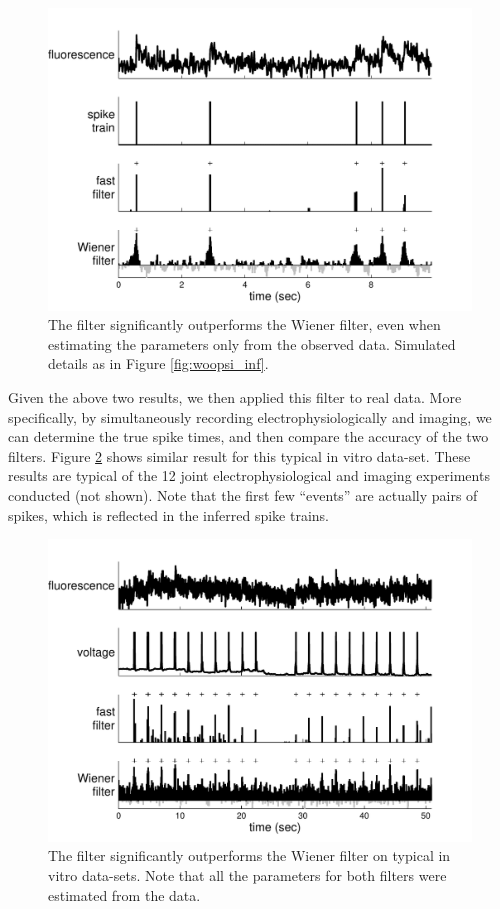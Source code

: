 \begin{figure}[h!]
\centering \includegraphics[width=.9\linewidth]{../figs/woopsi_learn}
\caption{The \foopsi filter significantly outperforms the Wiener filter, even when estimating the parameters only from the observed data.  Simulated details as in Figure \ref{fig:woopsi_inf}.} \label{fig:woopsi_learn}
\end{figure}

Given the above two results, we then applied this \foopsi filter to real data.  More specifically, by simultaneously recording electrophysiologically and imaging, we can determine the true spike times, and then compare the accuracy of the two filters.  Figure \ref{fig:woopsi_data} shows similar result for this typical in vitro data-set.  These results are typical of the 12 joint electrophysiological and imaging experiments conducted (not shown). Note that the first few ``events'' are actually pairs of spikes, which is reflected in the inferred spike trains.

\begin{figure}[h!]
\centering \includegraphics[width=.9\linewidth]{../figs/woopsi_data4}
\caption{The \foopsi filter significantly outperforms the Wiener filter on typical in vitro data-sets.  Note that all the parameters for both filters were estimated from the data.} \label{fig:woopsi_data}
\end{figure}

